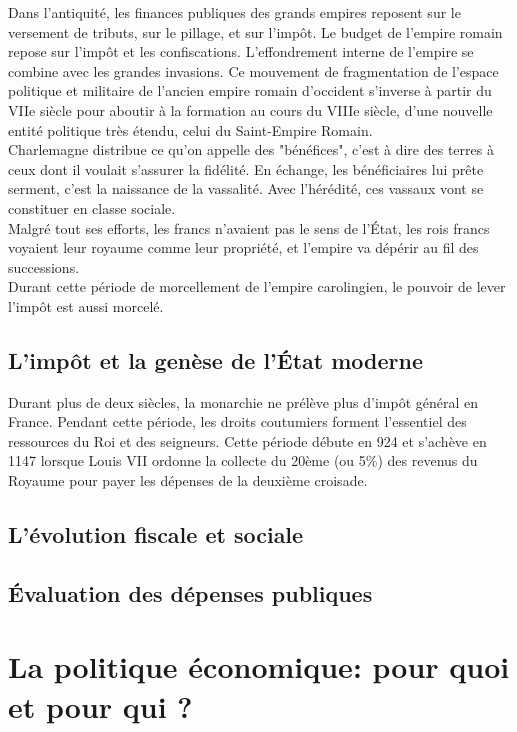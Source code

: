 \documentclass[10pt, a4paper, openany]{book}
\begin{document}
Dans l'antiquité, les finances publiques des grands empires reposent sur le versement de tributs, sur le pillage, et sur l'impôt. Le budget de l'empire romain repose sur l'impôt et les confiscations. L'effondrement interne de l'empire se combine avec les grandes invasions. Ce mouvement de fragmentation de l'espace politique et militaire de l'ancien empire romain d'occident s'inverse à partir du VIIe siècle pour aboutir à la formation au cours du VIIIe siècle, d'une nouvelle entité politique très étendu, celui du Saint-Empire Romain. \\
Charlemagne distribue ce qu'on appelle des "bénéfices", c'est à dire des terres à ceux dont il voulait s'assurer la fidélité. En échange, les bénéficiaires lui prête serment, c'est la naissance de la vassalité. Avec l'hérédité, ces vassaux vont se constituer en classe sociale. \\
Malgré tout ses efforts, les francs n'avaient pas le sens de l'État, les rois francs voyaient leur royaume comme leur propriété, et l'empire va dépérir au fil des successions. \\
Durant cette période de morcellement de l'empire carolingien, le pouvoir de lever l'impôt est aussi morcelé. 

\section{L'impôt et la genèse de l'État moderne}

Durant plus de deux siècles, la monarchie ne prélève plus d'impôt général en France. Pendant cette période, les droits coutumiers forment l'essentiel des ressources du Roi et des seigneurs. Cette période débute en 924 et s'achève en 1147 lorsque Louis VII ordonne la collecte du 20ème (ou 5\%) des revenus du Royaume pour payer les dépenses de la deuxième croisade. 



\section{L'évolution fiscale et sociale}


\section{Évaluation des dépenses publiques}



\chapter{La politique économique: pour quoi et pour qui ?}
\end{document}
